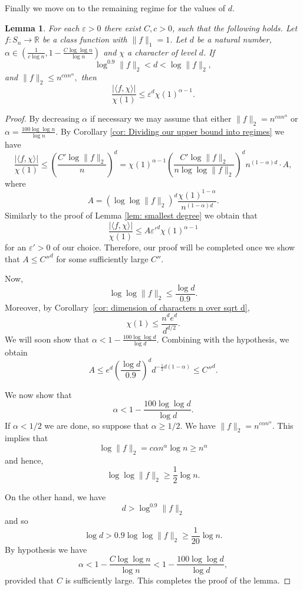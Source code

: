 \documentclass[11pt, letterpaper]{amsart}
\newtheorem{lem}[thm]{Lemma}
\newcommand\eps{\varepsilon}
\renewcommand\ge{\geqslant}
\renewcommand\le{\leqslant}
\renewcommand{\epsilon}{\eps}
\begin{document}
Finally we move on to the remaining regime for the values of $d$.
\begin{lem}\label{lem:medium degee}
For each $\epsilon>0$ there exist $C,c>0$, such that the following holds. Let $f\colon S_n \to \mathbb{R}$ be a class function with $\|f\|_1=1$. Let $d$ be a natural number, $\alpha\in \left( \frac{1}{c\log n}, 1 - \frac{C\log \log n}{\log n}\right)$ and  $\chi$ a character of level $d$. If \[\log^{0.9}\|f\|_2 < d < \log\|f\|_2,\] and  $\|f\|_2 \le n^{c\alpha n^{\alpha}},$ then
\[ \frac{|\langle f ,\chi \rangle|}{\chi(1)} \le \epsilon^{d}\chi(1)^{\alpha - 1}.\]
\end{lem}
\begin{proof}
By decreasing $\alpha$ if necessary we may assume that either $\|f\|_2 = n^{c\alpha n^{\alpha}}$ or  $\alpha = \frac{100\log \log n}{\log n}$. By Corollary \ref{cor: Dividing our upper bound into regimes} we have  
    \[
   \frac{|\langle f ,\chi \rangle|}{\chi(1)} 
   \le \left(\frac{C'\log\|f\|_2}{n}\right)^d = \chi(1)^{\alpha-1}\left(\frac{C'\log\|f\|_2}{n\log \log \|f\|_2}\right)^d n^{(1-\alpha)d}\cdot  A,\]
   where 
   \[
   A = \left(\log \log \|f\|_2\right)^d\frac{\chi(1)^{1-\alpha}}{n^{(1-\alpha)d}}.
   \]
   Similarly to the proof of Lemma \ref{lem: smallest degree} we obtain that \[\frac{|\langle f,\chi \rangle|}{\chi(1)} \le A\epsilon'^d\chi(1)^{\alpha-1}\]
   for an $\epsilon'>0$ of our choice. 
   Therefore, our proof will be completed once we show that $A\le C''^d$ for some sufficiently large $C''$.
   
    Now, \[\log\log \|f\|_2 \le \frac{\log d}{0.9}.\] Moreover, by Corollary~\ref{cor: dimension of characters n over sqrt d}, \[\chi(1)\le \frac{n^de^d}{d^{d/2}}.\] We will soon show that $\alpha< 1-\frac{100\log \log d}{\log d}$. Combining with the hypothesis, we obtain
    \[
    A \le e^{d} \left(\frac{\log d}{0.9}\right)^d d^{-\frac{1}{2}d(1-\alpha)} \le C''^d.
    \]
    
    We now show that  $$\alpha< 1-\frac{100\log \log d}{\log d}.$$ If $\alpha <1/2$ we are done, so suppose that $\alpha \ge 1/2.$ We have $\|f\|_2 = n^{c\alpha n^{\alpha}}$. This implies that
    \[
    \log \|f\|_2 = c\alpha n^{\alpha}\log n \ge n^{\alpha} 
    \]
    and hence, 
    \[
     \log \log \|f\|_2 \ge  \frac{1}{2}\log n.
    \]
    
    On the other hand, we have 
    \[
    d >  \log^{0.9} \|f\|_2
    \] and so 
    \[
    \log d > 0.9 \log \log \|f\|_2 \ge \frac{1}{20}\log n. 
    \]
By hypothesis we have 
\[
\alpha < 1-\frac{C\log\log n}{\log n}< 1-\frac{100\log \log d}{\log d}, 
\]
provided that $C$ is sufficiently large. This completes the proof of the lemma.
\end{proof}
\end{document}
